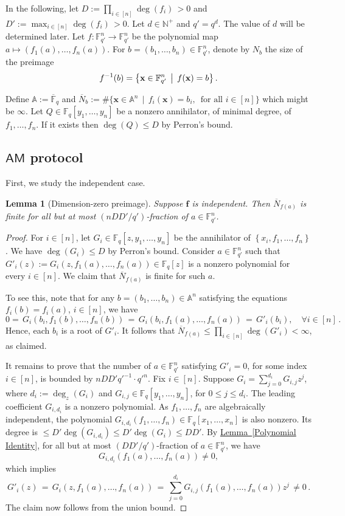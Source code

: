 \documentclass[11pt]{article}
\numberwithin{equation}{section}
\newtheorem{lemma}[theorem]{Lemma}
\theoremstyle{definition}
\theoremstyle{plain}
\newcommand{\N}{\mathbb N}
\newcommand{\cclass}[1]{\textsf{#1}}
\newcommand{\expref}[2]{\hyperref[#2]{#1~\ref{#2}}}
\newcommand{\F}{\mathbb{F}}
\newcommand{\aff}{\mathbb{A}}
\newcommand{\ol}[1]{\overline{#1}}
\newcommand{\inbrace }[1]{\left\{#1\right\}}
\newcommand{\AM}{\cclass{AM}\xspace}  %
\begin{document}
 In the following, let $D:=\prod_{i\in [n]}\deg(f_i) \,>0$ and $D':=\max_{i\in [n]} \deg(f_i) \,>0$. Let $d\in\N^+$ and $q'=q^d$. The value of $d$ will be determined later.
 Let $f:\F_{q'}^n\to\F_{q'}^n$ be the polynomial map $a\mapsto (f_1(a),\dots,f_n(a))$. For $b=(b_1,\dots,b_n)\in \F_{q'}^n$, denote by $N_b$ the size of the preimage
 \[
   f^{-1}(b)=\left\{\mathbf x \in \F_{q'}^n \,\bigm|\, f(\mathbf x) = b \right\}.
 \]

Define $\aff:=\ol{\F}_q$ and $\overline{N}_b:= \#\{\mathbf x \in \aff^n \,\mid\, f_i(\mathbf x) = b_i, \, \text{ for all } i\in[n] \}$ which might be $\infty$.
Let $Q\in\F_q[y_1,\dots,y_n]$ be a nonzero annihilator, of minimal degree, of $f_1,\dots,f_n$. If it exists then $\deg(Q)\leq D$ by Perron's bound. 

\subsection{\texorpdfstring{$\AM$}{AM} protocol}

First, we study the independent case.

%
%
\begin{lemma}[Dimension-zero preimage]\label{lem_finite}
Suppose $\mathbf f$
%
is  %
independent. Then $\overline{N}_{f(a)}$ is \emph{finite} for all but at most $(nDD'/q')$-fraction of $a\in\F_{q'}^n$.
\end{lemma}
\begin{proof}
For $i\in [n]$, let $G_i\in\F_q[z, y_1,\dots,y_n]$ be the annihilator of $\inbrace{x_i, f_1,\dots,f_n}$. We have $\deg(G_i)\leq D$ by Perron's bound. 
Consider $a\in\F_{q'}^n$ such that  $G'_i(z):= G_i(z, f_1(a),\dots,f_n(a))\in\F_q[z]$ is a nonzero polynomial for every $i\in [n]$.
We claim that $\overline{N}_{f(a)}$ is finite for such $a$. 

To see this, note that for any $b=(b_1,\dots,b_n)\in \aff^n$ satisfying the equations $f_i(b)=f_i(a)$, $i\in[n]$, we have
\[
0=\, G_i(b_i, f_1(b), \dots, f_n(b)) \,=\, G_i(b_i, f_1(a),\dots, f_n(a)) \,=\, G'_i(b_i), \quad\forall i\in [n] \,.
\]
Hence, each $b_i$ is a root of $G'_i$. It follows that $\overline{N}_{f(a)} \leq \prod_{i\in[n]} \deg(G'_i) < \infty$, as claimed. 

It remains to prove  that the number of $a\in\F_{q'}^n$ satisfying $G'_i=0$, for some index $i\in [n]$, is bounded by $nDD'q'^{-1}\cdot q'^{n}$.
Fix $i\in [n]$. Suppose $G_i=\sum_{j=0}^{d_i} G_{i,j} z^j$, where $d_i:=\deg_z(G_i)$ and $G_{i,j}\in \F_q[y_1,\dots,y_n]$, for $0\leq j\leq d_i$.
The leading coefficient $G_{i,d_i}$ is a nonzero polynomial. As $f_1,\dots,f_n$ are algebraically independent, the polynomial $G_{i,d_i}(f_1,\dots,f_n)\in\F_q[x_1,\dots,x_n]$ is also nonzero.
Its degree is $\le D'\deg(G_{i,d_i}) \leq D'\deg(G_i) \leq DD'$.
By 
%
\expref{Lemma}{Polynomial Identity},  %
for all but at most $(DD'/q')$-fraction of $a\in \F_{q'}^n$, we have 
%
\[
G_{i,d_i}(f_1(a),\dots,f_n(a))\neq 0,
\]  %
which   implies  
\[
G'_i(z) \,=\, G_i(z, f_1(a),\dots,f_n(a)) \,=\, \sum_{j=0}^{d_i} G_{i,j}(f_1(a),\dots,f_n(a)) z^j \,\neq 0 \,.
\]
The claim now follows from the union bound.
\end{proof}
\end{document}
